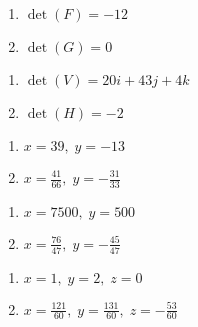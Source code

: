\documentclass{ximera}
\begin{document}
\begin{multicols}{2}
\begin{enumerate}
\setcounter{enumi}{\value{HW}}

\item $\det(F) = -12$
\item $\det(G) = 0$

\setcounter{HW}{\value{enumi}}
\end{enumerate}
\end{multicols}

\begin{multicols}{2}
\begin{enumerate}
\setcounter{enumi}{\value{HW}}

\item $\det(V) = 20i + 43j + 4k$
\item $\det(H) = -2$

\setcounter{HW}{\value{enumi}}
\end{enumerate}
\end{multicols}

\begin{multicols}{2}
\begin{enumerate}
\setcounter{enumi}{\value{HW}}

\item $x = 39, \; y = -13$
\item $x = \frac{41}{66}, \; y=-\frac{31}{33}$

\setcounter{HW}{\value{enumi}}
\end{enumerate}
\end{multicols}

\begin{multicols}{2}
\begin{enumerate}
\setcounter{enumi}{\value{HW}}

\item  $x=7500, \; y=500$
\item  $x = \frac{76}{47}, \; y=-\frac{45}{47}$


\setcounter{HW}{\value{enumi}}
\end{enumerate}
\end{multicols}

\begin{multicols}{2}
\begin{enumerate}
\setcounter{enumi}{\value{HW}}

\item $x = 1, \; y = 2, \; z = 0$
\item $x = \frac{121}{60}, \; y = \frac{131}{60}, \; z = -\frac{53}{60}$


\setcounter{HW}{\value{enumi}}
\end{enumerate}
\end{multicols}
\end{document}
